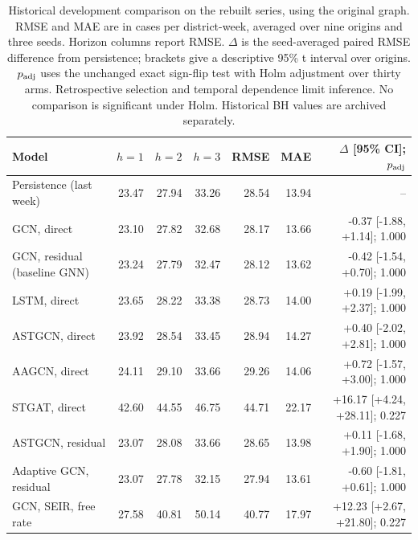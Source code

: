 \begin{table}[t]
\centering
\caption{Historical development comparison on the rebuilt series, using the original graph. RMSE and MAE are in cases per district-week, averaged over nine origins and three seeds. Horizon columns report RMSE. $\Delta$ is the seed-averaged paired RMSE difference from persistence; brackets give a descriptive 95\% t interval over origins. $p_{\rm adj}$ uses the unchanged exact sign-flip test with Holm adjustment over thirty arms. Retrospective selection and temporal dependence limit inference. No comparison is significant under Holm. Historical BH values are archived separately.}
\label{tab:main}
\small\setlength{\tabcolsep}{3pt}
\begin{tabular}{@{}p{2.5in}rrrrrr@{}}
\toprule
Model & $h=1$ & $h=2$ & $h=3$ & RMSE & MAE & $\Delta$ [95\% CI]; $p_{\rm adj}$ \\
\midrule
Persistence (last week) & 23.47 & 27.94 & 33.26 & 28.54 & 13.94 & -- \\ %

GCN, direct & 23.10 & 27.82 & 32.68 & 28.17 & 13.66 & -0.37 [-1.88, +1.14]; 1.000 \\ %

GCN, residual (baseline GNN) & 23.24 & 27.79 & 32.47 & 28.12 & 13.62 & -0.42 [-1.54, +0.70]; 1.000 \\ %

LSTM, direct & 23.65 & 28.22 & 33.38 & 28.73 & 14.00 & +0.19 [-1.99, +2.37]; 1.000 \\ %

ASTGCN, direct & 23.92 & 28.54 & 33.45 & 28.94 & 14.27 & +0.40 [-2.02, +2.81]; 1.000 \\ %

AAGCN, direct & 24.11 & 29.10 & 33.66 & 29.26 & 14.06 & +0.72 [-1.57, +3.00]; 1.000 \\ %

STGAT, direct & 42.60 & 44.55 & 46.75 & 44.71 & 22.17 & +16.17 [+4.24, +28.11]; 0.227 \\ %

ASTGCN, residual & 23.07 & 28.08 & 33.66 & 28.65 & 13.98 & +0.11 [-1.68, +1.90]; 1.000 \\ %

Adaptive GCN, residual & 23.07 & 27.78 & 32.15 & 27.94 & 13.61 & -0.60 [-1.81, +0.61]; 1.000 \\ %

GCN, SEIR, free rate & 27.58 & 40.81 & 50.14 & 40.77 & 17.97 & +12.23 [+2.67, +21.80]; 0.227 \\ %


\end{tabular}
\end{table}
